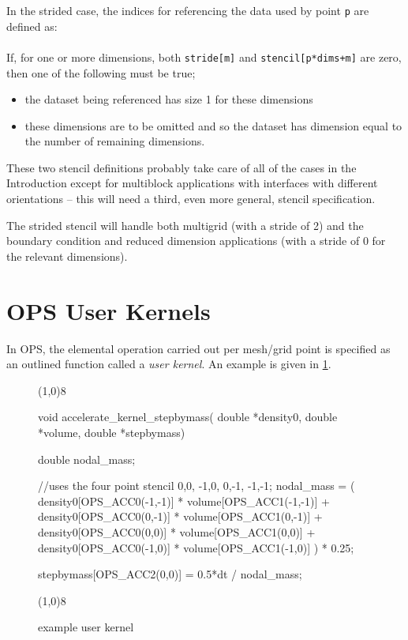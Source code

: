 \documentclass[11pt]{article}
\begin{document}
\vspace{0.2in}

\noindent In the strided case, the indices for referencing the data used by point {\tt p} are defined as:\\

\\

\noindent If, for one or more dimensions, both {\tt stride[m]} and {\tt stencil[p*dims+m]} are zero, then one of the
following must be true;
\begin{itemize}
\item
the dataset being referenced has size 1 for these dimensions
\item
these dimensions are to be omitted and so the dataset has 
dimension equal to the number of remaining dimensions.
\end{itemize}

\noindent These two stencil definitions probably take care of all of the cases in the Introduction except for multiblock
applications with interfaces with different orientations -- this will need a third, even more general, stencil
specification.

\noindent The strided stencil will handle both multigrid (with a stride of 2) and the boundary condition and reduced
dimension applications (with a stride of 0 for the relevant dimensions).


\newpage
\section{OPS User Kernels}

\noindent In OPS, the elemental operation carried out per mesh/grid point is specified as an outlined function called
a \textit{user kernel}. An example is given in \figurename{ \ref{fig:example}}.
\begin{figure}[h]\small
\vspace{-0pt}\noindent\line(1,0){8}\vspace{-20pt}
\begin{pyglist}[language=c]
void accelerate_kernel_stepbymass( double *density0, double *volume,
                                   double *stepbymass) {
  double nodal_mass;

  //uses the four point stencil {0,0, -1,0, 0,-1, -1,-1};
  nodal_mass = ( density0[OPS_ACC0(-1,-1)] * volume[OPS_ACC1(-1,-1)]
    + density0[OPS_ACC0(0,-1)] * volume[OPS_ACC1(0,-1)]
    + density0[OPS_ACC0(0,0)] * volume[OPS_ACC1(0,0)]
    + density0[OPS_ACC0(-1,0)] * volume[OPS_ACC1(-1,0)] ) * 0.25;

  stepbymass[OPS_ACC2(0,0)] = 0.5*dt / nodal_mass;
}
\end{pyglist}
\vspace{-10pt}\noindent\line(1,0){8}\vspace{-10pt}
\caption{\small example user kernel}
\normalsize\vspace{-0pt}\label{fig:example}
\end{figure}
\end{document}
